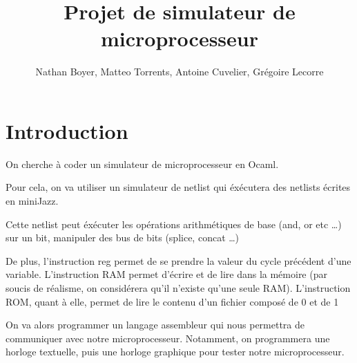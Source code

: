 \documentclass[12pt,a4paper,french]{article}
\title{Projet de simulateur de microprocesseur}
\author{Nathan Boyer, Matteo Torrents, Antoine Cuvelier, Grégoire Lecorre}
\begin{document}
\maketitle

\section*{Introduction}

On cherche à coder un simulateur de microprocesseur en Ocaml.

Pour cela, on va utiliser un simulateur de netlist qui éxécutera des netlists écrites en miniJazz.

Cette netlist peut éxécuter les opérations arithmétiques de base (and, or etc \ldots) sur un bit, manipuler des bus de bits (splice, concat \ldots)

De plus, l'instruction reg permet de se prendre la valeur du cycle précédent d'une variable. L'instruction RAM permet d'écrire et de lire dans la mémoire
(par soucis de réalisme, on considérera qu'il n'existe qu'une seule RAM). L'instruction ROM, quant à elle, permet de lire le contenu d'un fichier composé de 0 et de 1

On va alors programmer un langage assembleur qui nous permettra de communiquer avec notre microprocesseur. Notamment, on programmera une horloge textuelle, puis une horloge graphique
pour tester notre microprocesseur.
\end{document}
